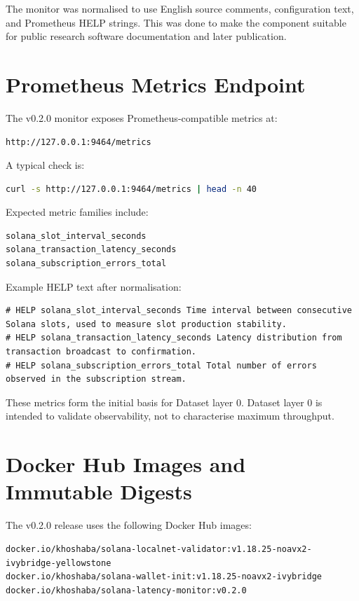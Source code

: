 \documentclass[11pt,a4paper]{article}
\begin{document}
The monitor was normalised to use English source comments, configuration text, and Prometheus HELP strings. This was done to make the component suitable for public research software documentation and later publication.

\section{Prometheus Metrics Endpoint}

The v0.2.0 monitor exposes Prometheus-compatible metrics at:

\begin{lstlisting}
http://127.0.0.1:9464/metrics
\end{lstlisting}

A typical check is:

\begin{lstlisting}[language=bash]
curl -s http://127.0.0.1:9464/metrics | head -n 40
\end{lstlisting}

Expected metric families include:

\begin{lstlisting}
solana_slot_interval_seconds
solana_transaction_latency_seconds
solana_subscription_errors_total
\end{lstlisting}

Example HELP text after normalisation:

\begin{lstlisting}
# HELP solana_slot_interval_seconds Time interval between consecutive Solana slots, used to measure slot production stability.
# HELP solana_transaction_latency_seconds Latency distribution from transaction broadcast to confirmation.
# HELP solana_subscription_errors_total Total number of errors observed in the subscription stream.
\end{lstlisting}

These metrics form the initial basis for Dataset layer 0. Dataset layer 0 is intended to validate observability, not to characterise maximum throughput.

\section{Docker Hub Images and Immutable Digests}

The v0.2.0 release uses the following Docker Hub images:

\begin{lstlisting}
docker.io/khoshaba/solana-localnet-validator:v1.18.25-noavx2-ivybridge-yellowstone
docker.io/khoshaba/solana-wallet-init:v1.18.25-noavx2-ivybridge
docker.io/khoshaba/solana-latency-monitor:v0.2.0
\end{lstlisting}
\end{document}
